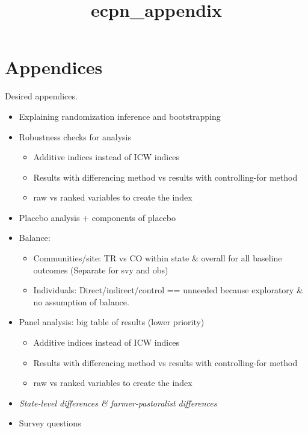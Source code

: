 \documentclass[
]{article}
\title{ecpn\_appendix}
\author{}
\date{\vspace{-2.5em}}
\providecommand{\tightlist}{%
  \setlength{\itemsep}{0pt}\setlength{\parskip}{0pt}}
\begin{document}
\maketitle

\hypertarget{appendices}{%
\section{Appendices}\label{appendices}}

Desired appendices.

\begin{itemize}
\tightlist
\item
  Explaining randomization inference and bootstrapping
\item
  Robustness checks for analysis

  \begin{itemize}
  \tightlist
  \item
    Additive indices instead of ICW indices
  \item
    Results with differencing method vs results with controlling-for
    method
  \item
    raw vs ranked variables to create the index
  \end{itemize}
\item
  Placebo analysis + components of placebo
\item
  Balance:

  \begin{itemize}
  \tightlist
  \item
    Communities/site: TR vs CO within state \& overall for all baseline
    outcomes (Separate for svy and obs)
  \item
    Individuals: Direct/indirect/control == unneeded because exploratory
    \& no assumption of balance.
  \end{itemize}
\item
  Panel analysis: big table of results (lower priority)

  \begin{itemize}
  \tightlist
  \item
    Additive indices instead of ICW indices
  \item
    Results with differencing method vs results with controlling-for
    method
  \item
    raw vs ranked variables to create the index
  \end{itemize}
\item
  \emph{State-level differences \& farmer-pastoralist differences}
\item
  Survey questions
\end{itemize}
\end{document}
